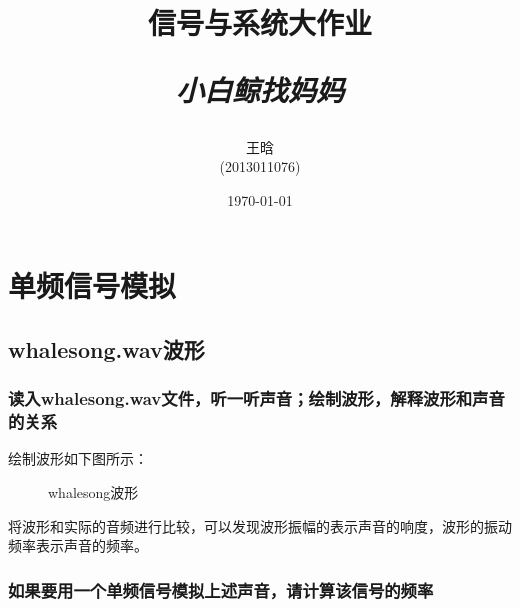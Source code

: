 \documentclass{article}
\begin{document}
	\title{信号与系统大作业 \\ [2ex] \begin{large} \emph{小白鲸找妈妈} \end{large} }
	\author{王晗\\(2013011076)}
	\date{\today}
	\maketitle
	\section{单频信号模拟}
		\subsection{whalesong.wav波形}
            \subsubsection*{读入whalesong.wav文件，听一听声音；绘制波形，解释波形和声音的关系}
            绘制波形如下图所示： 
            \begin{figure}[htb]
                \centering
                \hspace{10pt}
                \caption{whalesong波形}
                \label{fig:origin}
            \end{figure}
            
            将波形和实际的音频进行比较，可以发现波形振幅的表示声音的响度，波形的振动频率表示声音的频率。
            
            \subsubsection{如果要用一个单频信号模拟上述声音，请计算该信号的频率}
            
\end{document}
